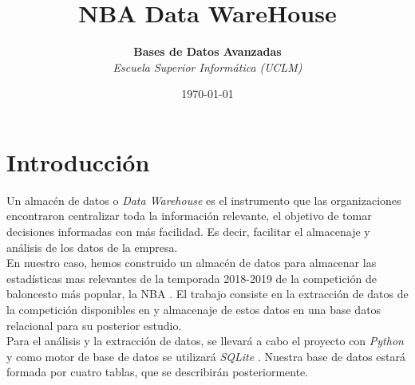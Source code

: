 \documentclass[11pt]{diazessay} %
\title{\textbf{NBA Data WareHouse}} %
\author{\textbf{Bases de Datos Avanzadas} \\ \textit{Escuela Superior Informática (UCLM)}} %
\date{\today} %
\begin{document}
\maketitle %



\begin{abstract}

\end{abstract}


\vspace{30pt} %


\section*{Introducción}
Un almacén de datos o \textit{Data Warehouse} es el instrumento que las organizaciones encontraron centralizar toda la información relevante, el objetivo de tomar decisiones informadas con más facilidad. Es decir, facilitar el almacenaje y análisis de los datos de la empresa.\\

En nuestro caso, hemos construido un almacén de datos para almacenar las estadísticas mas relevantes de la temporada 2018-2019 de la competición de baloncesto más popular, la NBA \cite{nba}. El trabajo consiste en la extracción de datos de la competición disponibles en \cite{basket_ref} y almacenaje de estos datos en una base datos relacional para su posterior estudio.\\

Para el análisis y la extracción de datos, se llevará a cabo el proyecto con \textit{Python} \cite{python} y como motor de base de datos se utilizará \textit{SQLite} \cite{sqlite}. Nuestra base de datos estará formada por cuatro tablas, que se describirán posteriormente.
\end{document}

